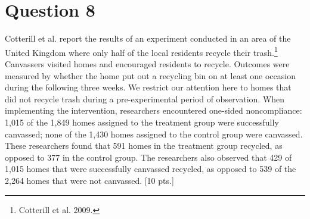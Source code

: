 \documentclass[11pt,notitlepage]{article}\usepackage[]{graphicx}\usepackage[]{color}
\begin{document}
\section*{Question 8}
Cotterill et al. report the results of an experiment conducted in an area of the United Kingdom where only half of the local residents recycle their trash.\footnote{Cotterill et al. 2009.} Canvassers visited homes and encouraged residents to recycle. Outcomes were measured by whether the home put out a recycling bin on at least one occasion during the following three weeks. We restrict our attention here to homes that did not recycle trash during a pre-experimental period of observation. When implementing the intervention, researchers encountered one-sided noncompliance: 1,015 of the 1,849 homes assigned to the treatment group were successfully canvassed; none of the 1,430 homes assigned to the control group were canvassed. These researchers found that 591 homes in the treatment group recycled, as opposed to 377 in the control group. The researchers also observed that 429 of 1,015 homes that were successfully canvassed recycled, as opposed to 539 of the 2,264 homes that were not canvassed. [10 pts.]
\end{document}
